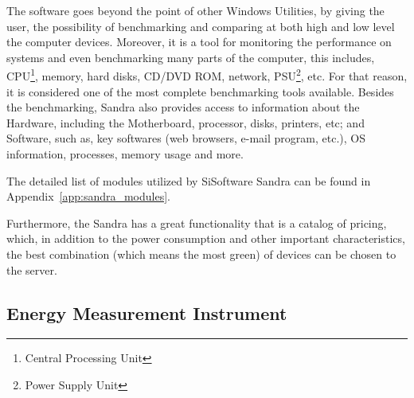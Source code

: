     The software goes beyond the point of other Windows Utilities, by giving the user, the possibility of benchmarking and comparing at both high and low level the computer devices. Moreover, it is a tool for monitoring the performance on systems and even benchmarking many parts of the computer, this includes, CPU\footnote{Central Processing Unit}, memory, hard disks, CD/DVD ROM, network, PSU\footnote{Power Supply Unit}, etc. For that reason, it is considered one of the most complete benchmarking tools available. Besides the benchmarking, Sandra also provides access to information about the Hardware, including the Motherboard, processor, disks, printers, etc; and Software, such as, key softwares (web browsers, e-mail program, etc.), OS information, processes, memory usage and more.
    
    The detailed list of modules utilized by SiSoftware Sandra can be found in Appendix~\ref{app:sandra_modules}.
    
    Furthermore, the Sandra has a great functionality that is a catalog of pricing, which, in addition to the power consumption and other important characteristics, the best combination (which means the most green) of devices can be chosen to the server.
    
    \subsection{Energy Measurement Instrument} \label{sec3:energy_measurement_instrument}

